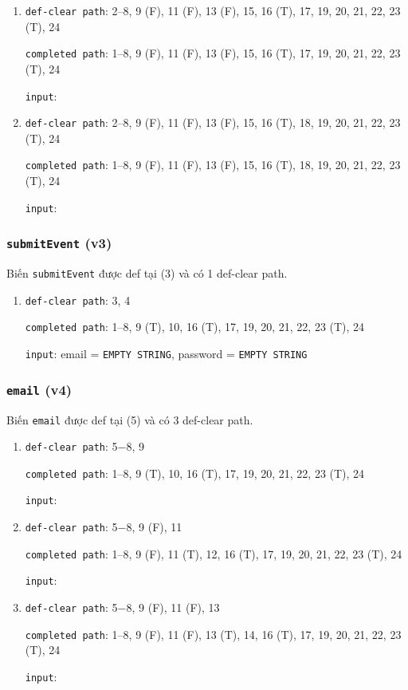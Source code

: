 \documentclass{article}
\begin{document}
\begin{enumerate}
    \item \texttt{def-clear path}: 2--8, 9 (F), 11 (F), 13 (F), 15, 16 (T), 17, 19, 20, 21, 22, 23 (T), 24
          \par \texttt{completed path}: 1--8, 9 (F), 11 (F), 13 (F), 15, 16 (T), 17, 19, 20, 21, 22, 23 (T), 24
          \par \texttt{input}:

    \item \texttt{def-clear path}: 2--8, 9 (F), 11 (F), 13 (F), 15, 16 (T), 18, 19, 20, 21, 22, 23 (T), 24
          \par \texttt{completed path}: 1--8, 9 (F), 11 (F), 13 (F), 15, 16 (T), 18, 19, 20, 21, 22, 23 (T), 24
          \par \texttt{input}:
\end{enumerate}

\subsubsection*{\texttt{submitEvent} (v3)}

\par Biến \texttt{submitEvent} được def tại (3) và có 1 def-clear path.

\begin{enumerate}
    \item \texttt{def-clear path}: 3, 4
          \par \texttt{completed path}: 1--8, 9 (T), 10, 16 (T), 17, 19, 20, 21, 22, 23 (T), 24
          \par \texttt{input}: email = \texttt{EMPTY STRING}, password = \texttt{EMPTY STRING}
\end{enumerate}

\subsubsection*{\texttt{email} (v4)}

\par Biến \texttt{email} được def tại (5) và có 3 def-clear path.

\begin{enumerate}
    \item \texttt{def-clear path}: 5$-$8, 9
          \par \texttt{completed path}: 1--8, 9 (T), 10, 16 (T), 17, 19, 20, 21, 22, 23 (T), 24
          \par \texttt{input}:

    \item \texttt{def-clear path}: 5$-$8, 9 (F), 11
          \par \texttt{completed path}: 1--8, 9 (F), 11 (T), 12, 16 (T), 17, 19, 20, 21, 22, 23 (T), 24
          \par \texttt{input}:

    \item \texttt{def-clear path}: 5$-8$, 9 (F), 11 (F), 13
          \par \texttt{completed path}: 1--8, 9 (F), 11 (F), 13 (T), 14, 16 (T), 17, 19, 20, 21, 22, 23 (T), 24
          \par \texttt{input}:
\end{enumerate}
\end{document}
